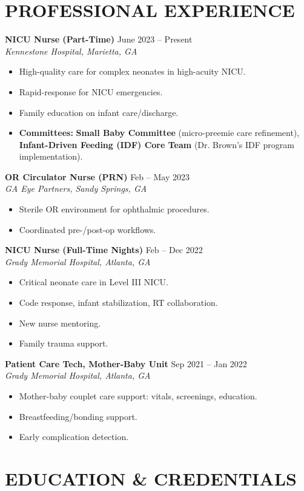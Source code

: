 \documentclass[letterpaper, 9.5pt]{article} %
\newcommand{\experience}[4]{%
    \textbf{#1} \hfill {\footnotesize #2} \\ %
    \textit{#3} \hfill \textit{#4}
    \vspace{0.2mm} %
    \begin{itemize}[leftmargin=*, itemsep=0pt, parsep=0pt]
        \renewcommand{\labelitemi}{\tiny\textbullet} %
}
\begin{document}
\section{PROFESSIONAL EXPERIENCE}
\experience{NICU Nurse (Part-Time)}{June 2023 – Present}{Kennestone Hospital, Marietta, GA}{}
    \item High-quality care for complex neonates in high-acuity NICU.
    \item Rapid-response for NICU emergencies.
    \item Family education on infant care/discharge.
    \item \textbf{Committees:} \textbf{Small Baby Committee} (micro-preemie care refinement), \textbf{Infant-Driven Feeding (IDF) Core Team} (Dr. Brown's IDF program implementation). %
    \end{itemize}

\experience{OR Circulator Nurse (PRN)}{Feb – May 2023}{GA Eye Partners, Sandy Springs, GA}{} %
    \item Sterile OR environment for ophthalmic procedures.
    \item Coordinated pre-/post-op workflows.
    \end{itemize}

\experience{NICU Nurse (Full-Time Nights)}{Feb – Dec 2022}{Grady Memorial Hospital, Atlanta, GA}{} %
    \item Critical neonate care in Level III NICU.
    \item Code response, infant stabilization, RT collaboration.
    \item New nurse mentoring.
    \item Family trauma support.
    \end{itemize}

\experience{Patient Care Tech, Mother-Baby Unit}{Sep 2021 – Jan 2022}{Grady Memorial Hospital, Atlanta, GA}{} %
    \item Mother-baby couplet care support: vitals, screenings, education.
    \item Breastfeeding/bonding support.
    \item Early complication detection.
    \end{itemize}

\vspace{1mm}

\section{EDUCATION \& CREDENTIALS}
\end{document}
